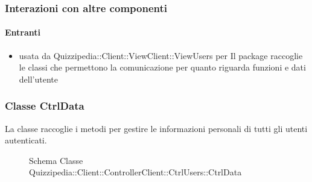 \subsubsection{Interazioni con altre componenti}
\paragraph{Entranti}
\begin{itemize}
\item usata da Quizzipedia::Client::ViewClient::ViewUsers per Il package raccoglie le classi che permettono la comunicazione per quanto riguarda funzioni e dati dell'utente
\end{itemize}
\subsubsection{Classe CtrlData}
La classe raccoglie i metodi per gestire le informazioni personali di tutti gli utenti autenticati.
\begin{figure}[H]
\centering
\noindent{}
\caption[Schema Classe CtrlData]{Schema Classe Quizzipedia::Client::ControllerClient::CtrlUsers::CtrlData}
\end{figure}
